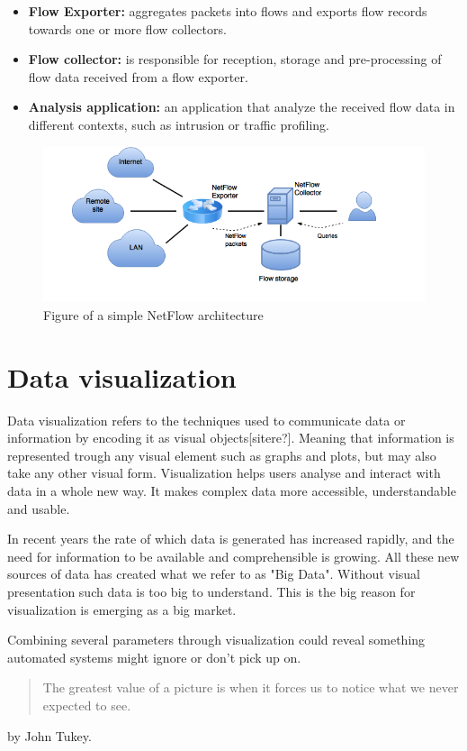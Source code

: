 \begin{itemize}
\item \textbf{Flow Exporter:} aggregates packets into flows and exports flow records towards one or more flow collectors. 

\item \textbf{Flow collector:} is responsible for reception, storage and pre-processing of flow data received from a flow exporter.

\item \textbf{Analysis application:} an application that analyze the received flow data in different contexts, such as intrusion or traffic profiling.
\end{itemize}

\begin{figure}[h!]
\includegraphics[scale=0.5]{netflow_arch}
\caption{Figure of a simple NetFlow architecture}
\end{figure}

\section{Data visualization}
Data visualization refers to the techniques used to communicate data or information by encoding it as visual objects[sitere?]. Meaning that information is represented trough any visual element such as graphs and plots, but may also take any other visual form. Visualization helps users analyse and interact with data in a whole new way. It makes complex data more accessible, understandable and usable. 

In recent years the rate of which data is generated has increased rapidly, and the need for information to be available and comprehensible is growing. All these new sources of data has created what we refer to as "Big Data". Without visual presentation such data is too big to understand. This is the big reason for visualization is emerging as a big market. 

Combining several parameters through visualization could reveal something automated systems might ignore or don't pick up on. \begin{quotation}
The greatest value of a picture is when it forces us to notice what we never expected to see.
\end{quotation} by John Tukey.

